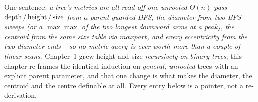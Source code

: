 

One sentence: \emph{a tree's metrics are all read off one unrooted $\Theta(n)$ pass --
$\operatorname{depth}/\operatorname{height}/\operatorname{size}$ from a parent-guarded DFS, the diameter from two BFS sweeps (or a
$\max\max$ of the two longest downward arms at a peak), the centroid from the same size
table via $\mathit{maxpart}$, and every eccentricity from the two diameter ends -- so no
metric query is ever worth more than a couple of linear scans}. Chapter~1 grew height and
size \emph{recursively on binary trees}; this chapter re-frames the identical induction on
\emph{general, unrooted} trees with an explicit parent parameter, and that one change is
what makes the diameter, the centroid and the centre definable at all. Every entry below
is a pointer, not a re-derivation.

